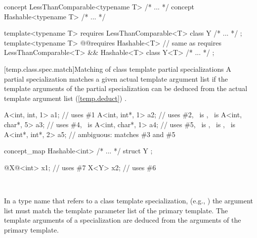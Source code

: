 \documentclass[american]{book}
\begin{document}
\begin{paras}
\pnum {} \color{addclr}
\begin{codeblock}
concept LessThanComparable<typename T> { /* ... */ }
concept Hashable<typename T> { /* ... */ }

template<typename T> requires LessThanComparable<T> class Y { /* ... */ };
template<typename T> 
  @\textcolor{addclr}{}@requires Hashable<T> // same as requires LessThanComparable<T> \&\& Hashable<T>
  class Y<T> { /* ... */ }; 
\end{codeblock}
\color{black}
\addedConcepts{\mbox{\exitexample}}

[temp.class.spec.match]{Matching of class template partial specializations}
\setcounter{Paras}{1}
\pnum
A partial specialization matches a given actual template argument
list if the template arguments of the partial specialization can be
deduced from the actual template argument list (\ref{temp.deduct})
.
\enterexample\ 

\begin{codeblock}
A<int, int, 1>   a1;            // uses \#1
A<int, int*, 1>  a2;            // uses \#2, \ is , \ is 
A<int, char*, 5> a3;            // uses \#4, \ is 
A<int, char*, 1> a4;            // uses \#5, \ is , \ is , \ is 
A<int*, int*, 2> a5;            // ambiguous: matches \#3 and \#5
\end{codeblock}
\color{addclr}
\begin{codeblock}
concept_map Hashable<int> { /* ... */ }
struct Y { };

@\textcolor{addclr}{X}@<int> x1;                     // uses \#7
X<Y> x2;                       // uses \#6
\end{codeblock}
\color{black}
\exitexample\ 

\setcounter{Paras}{3}
\pnum
In a type name that refers to a class template specialization, (e.g.,
)
the argument list must match the template parameter list of the primary
template. 
The template arguments of a specialization are deduced from the arguments
of the primary template.


\end{paras}
\end{document}

